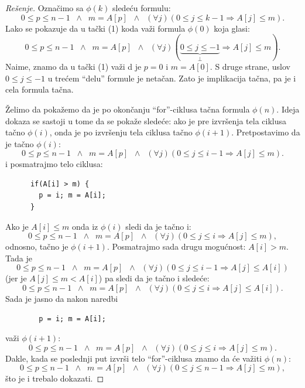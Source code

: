 \begin{proof}[Re\v senje]
  Ozna\v cimo sa $\phi(k)$ slede\'cu formulu:
  $$
    0 \le p \le n - 1 \;\;\land\;\; m = A[p] \;\;\land\;\; (\forall j)(0 \le j \le k - 1 \Rightarrow A[j] \le m).
  $$
  Lako se pokazuje da u ta\v cki (1) koda va\v zi formula $\phi(0)$ koja glasi:
  $$
    0 \le p \le n - 1 \;\;\land\;\; m = A[p] \;\;\land\;\; (\forall j)(\underbrace{0 \le j \le -1}_\bot \Rightarrow A[j] \le m).
  $$
  Naime, znamo da u ta\v cki (1) va\v zi d je $p = 0$ i $m = A[0]$. S druge strane, uslov $0 \le j \le -1$ u tre\'cem ``delu'' formule
  je neta\v can. Zato je implikacija ta\v cna, pa je i cela formula ta\v cna.
  
  \v Zelimo da poka\v zemo da je po okon\v canju ``for''-ciklusa ta\v cna formula $\phi(n)$. Ideja dokaza se sastoji u tome
  da se poka\v ze slede\'ce: ako je pre izvr\v senja tela ciklusa ta\v cno $\phi(i)$, onda je po izvr\v senju tela ciklusa
  ta\v cno $\phi(i + 1)$. Pretpostavimo da je ta\v cno $\phi(i)$:
  $$
    0 \le p \le n - 1 \;\;\land\;\; m = A[p] \;\;\land\;\; (\forall j)(0 \le j \le i - 1 \Rightarrow A[j] \le m).
  $$
  i posmatrajmo telo ciklusa:
{\small
\begin{verbatim}
      if(A[i] > m) {
        p = i; m = A[i];
      }
\end{verbatim}
}
\noindent
  Ako je $A[i] \le m$ onda iz $\phi(i)$ sledi da je ta\v cno i:
  $$
    0 \le p \le n - 1 \;\;\land\;\; m = A[p] \;\;\land\;\; (\forall j)(0 \le j \le i \Rightarrow A[j] \le m),
  $$
  odnosno, ta\v cno je $\phi(i + 1)$. Posmatrajmo sada drugu mogu\'cnost: $A[i] > m$. Tada je
  $$
    0 \le p \le n - 1 \;\;\land\;\; m = A[p] \;\;\land\;\; (\forall j)(0 \le j \le i - 1 \Rightarrow A[j] \le A[i])
  $$
  (jer je $A[j] \le m < A[i]$) pa sledi da je ta\v cno i slede\'ce:
  $$
    0 \le p \le n - 1 \;\;\land\;\; m = A[p] \;\;\land\;\; (\forall j)(0 \le j \le i \Rightarrow A[j] \le A[i]).
  $$
  Sada je jasno da nakon naredbi
{\small
\begin{verbatim}
        p = i; m = A[i];
\end{verbatim}
}
  \noindent
  va\v zi $\phi(i + 1)$:
  $$
    0 \le p \le n - 1 \;\;\land\;\; m = A[p] \;\;\land\;\; (\forall j)(0 \le j \le i \Rightarrow A[j] \le m).
  $$
  Dakle, kada se poslednji put izvr\v si telo ``for''-ciklusa znamo da \'ce va\v ziti $\phi(n)$:
  $$
    0 \le p \le n - 1 \;\;\land\;\; m = A[p] \;\;\land\;\; (\forall j)(0 \le j \le n - 1 \Rightarrow A[j] \le m),
  $$
  \v sto je i trebalo dokazati.
\end{proof}



